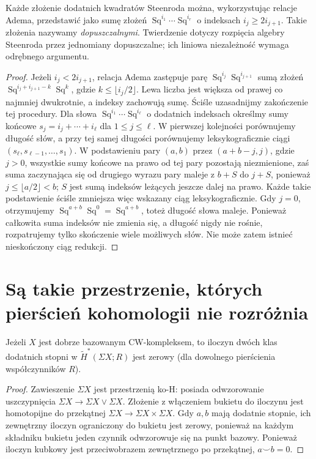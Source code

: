 \begin{twierdzenie}
Każde złożenie dodatnich kwadratów Steenroda można,
wykorzystując relacje Adema, przedstawić jako sumę
złożeń
$\operatorname{Sq}^{i_1}\cdots\operatorname{Sq}^{i_r}$
o indeksach $i_j\ge2i_{j+1}$. Takie złożenia nazywamy
\emph{dopuszczalnymi}. Twierdzenie dotyczy rozpięcia
algebry Steenroda przez jednomiany dopuszczalne;
ich liniowa niezależność wymaga odrębnego argumentu.
\end{twierdzenie}
\begin{proof}
Jeżeli $i_j<2i_{j+1}$, relacja Adema zastępuje
parę $\operatorname{Sq}^{i_j}\operatorname{Sq}^{i_{j+1}}$
sumą złożeń $\operatorname{Sq}^{i_j+i_{j+1}-k}\operatorname{Sq}^{k}$,
gdzie $k\le\lfloor i_j/2\rfloor$.
Lewa liczba jest większa od prawej co najmniej dwukrotnie,
a indeksy zachowują sumę.
Ściśle uzasadnijmy zakończenie tej procedury. Dla słowa
$\operatorname{Sq}^{i_1}\cdots\operatorname{Sq}^{i_\ell}$
o dodatnich indeksach określmy sumy końcowe
$s_j=i_j+\cdots+i_\ell$ dla $1\le j\le\ell$.
W pierwszej kolejności porównujemy długość słów, a przy
tej samej długości porównujemy leksykograficznie ciągi
$(s_\ell,s_{\ell-1},\ldots,s_1)$. W podstawieniu
pary $(a,b)$ przez $(a+b-j,j)$, gdzie $j>0$,
wszystkie sumy końcowe na prawo od tej pary pozostają
niezmienione, zaś suma zaczynająca się od drugiego
wyrazu pary maleje z $b+S$ do $j+S$, ponieważ
$j\le\lfloor a/2\rfloor<b$; $S$ jest sumą
indeksów leżących jeszcze dalej na prawo.
Każde takie podstawienie ściśle zmniejsza więc
wskazany ciąg leksykograficznie. Gdy $j=0$, otrzymujemy
$\operatorname{Sq}^{a+b}\operatorname{Sq}^0=
\operatorname{Sq}^{a+b}$, toteż długość słowa maleje.
Ponieważ całkowita suma indeksów nie zmienia się,
a długość nigdy nie rośnie, rozpatrujemy tylko skończenie
wiele możliwych słów. Nie może zatem istnieć nieskończony
ciąg redukcji.
\end{proof}

\section{Są takie przestrzenie, których pierścień kohomologii nie rozróżnia}
\begin{lemat}
\label{lem:susp-cupzero-v8}
Jeżeli $X$ jest dobrze bazowanym CW-kompleksem,
to iloczyn dwóch klas dodatnich stopni w
$\widetilde H^*(\Sigma X;R)$ jest zerowy
(dla dowolnego pierścienia współczynników $R$).
\end{lemat}
\begin{proof}
Zawieszenie $\Sigma X$ jest przestrzenią ko-H: posiada
odwzorowanie uszczypnięcia
$\Sigma X\to\Sigma X\vee\Sigma X$.
Złożenie z włączeniem bukietu do iloczynu jest
homotopijne do przekątnej
$\Sigma X\to\Sigma X\times\Sigma X$.
Gdy $a,b$ mają dodatnie stopnie, ich zewnętrzny
iloczyn ograniczony do bukietu jest zerowy,
ponieważ na każdym składniku bukietu jeden czynnik
odwzorowuje się na punkt bazowy. Ponieważ iloczyn kubkowy
jest przeciwobrazem zewnętrznego po przekątnej,
$a\smile b=0$.
\end{proof}

